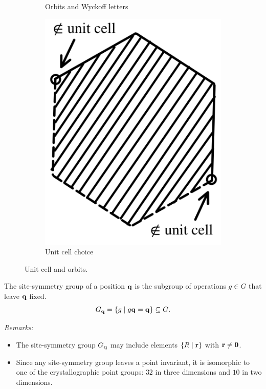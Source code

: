 \begin{figure}[H]
\begin{subfigure}{.3\textwidth}
  \caption{Orbits and Wyckoff letters}
  \label{fig:unitcell_orbitsymbols}
\end{subfigure}
\hfill
\begin{subfigure}{.235\textwidth}
  \centering
  \includegraphics[width=\linewidth]{fig/unitcell_limit.png}
  \caption{Unit cell choice}
  \label{fig:unitcell_limit}
\end{subfigure}
\caption{Unit cell and orbits.}
\label{fig:unitcell_orbits}
\end{figure}


\begin{definition} \label{def:sitesym}
The site-symmetry group of a position ${\vb{q}}$ is the subgroup of operations $g \in G$ that leave ${\vb{q}}$ fixed.
$$
G_{\vb{q}} = \{g \mid g {\vb{q}} = {\vb{q}}\} \subseteq G.
$$
\end{definition}

\textit{Remarks:}
\begin{itemize}
\item The site-symmetry group \( G_{\vb{q}} \) may include elements \(\{R \mid {\vb{r}}\}\) with \({\vb{r}} \neq {\vb{0}}\).
\item Since any site-symmetry group leaves a point invariant, it is isomorphic to one of the crystallographic point groups: $32$ in three dimensions and $10$ in two dimensions.

\end{itemize}

